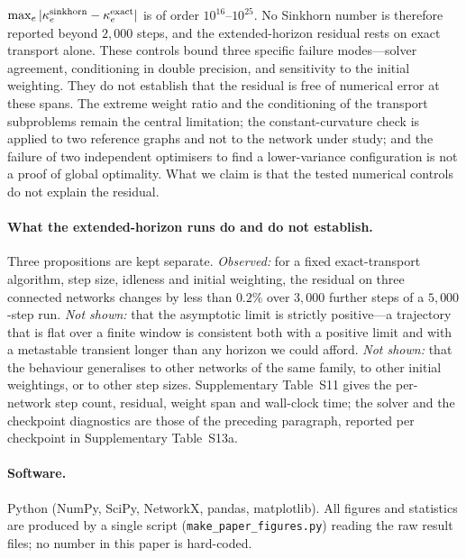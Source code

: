 \documentclass[11pt]{article}
\begin{document}
$\max_e|\kappa_e^{\rm sinkhorn}-\kappa_e^{\rm exact}|$ is of order
$10^{16}$--$10^{25}$. No {Sinkhorn} number is therefore reported beyond
$2{,}000$ steps, and the extended-horizon residual rests on exact transport
alone. These controls bound three specific failure modes---solver agreement,
conditioning in double precision, and sensitivity to the initial weighting. They
do not establish that the residual is free of numerical error at these spans.
The extreme weight ratio and the conditioning of the transport subproblems
remain the central limitation; the constant-curvature check is applied to two
reference graphs and not to the network under study; and the failure of two
independent optimisers to find a lower-variance configuration is not a proof of
global optimality. What we claim is that the tested numerical controls do not
explain the residual.

\paragraph{What the extended-horizon runs do and do not establish.} Three
propositions are kept separate. \emph{Observed:} for a fixed exact-transport
algorithm, step size, idleness and initial weighting, the residual on three
connected networks changes by less than $0.2\%$ over $3{,}000$ further steps of
a $5{,}000$-step run. \emph{Not shown:} that the asymptotic limit is strictly
positive---a trajectory that is flat over a finite window is consistent both
with a positive limit and with a metastable transient longer than any horizon
we could afford. \emph{Not shown:} that the behaviour generalises to other
networks of the same family, to other initial weightings, or to other step
sizes. Supplementary Table~S11 gives the per-network step count, residual, weight span and wall-clock time; the solver and the checkpoint diagnostics are those of the preceding paragraph, reported per checkpoint in Supplementary Table~S13a.

\paragraph{Software.} Python (NumPy, SciPy, NetworkX, pandas, matplotlib).
All figures and statistics are produced by a single script
(\texttt{make\_paper\_figures.py}) reading the raw result files; no number
in this paper is hard-coded.
\end{document}
